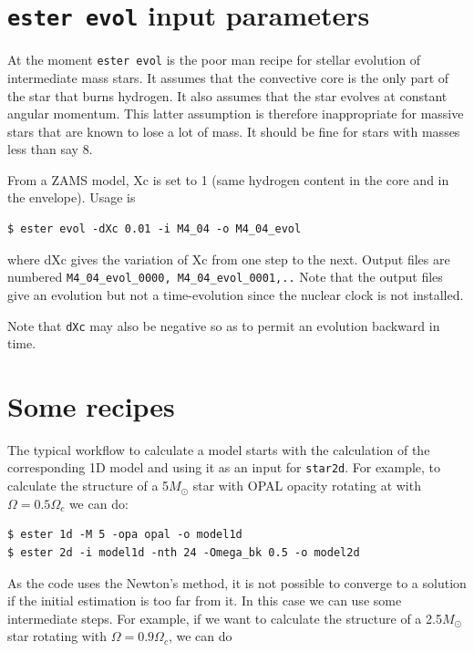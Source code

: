 \section{{\tt ester evol} input parameters}

At the moment {\tt ester evol} is the poor man recipe for stellar
evolution of intermediate mass stars. It assumes that the convective core
is the only part of the star that burns hydrogen. It also assumes that
the star evolves at constant angular momentum. This latter assumption
is therefore inappropriate for massive stars that are known to lose a
lot of mass. It should be fine for stars with masses less than say 8\msun.

From a ZAMS model, Xc is set to 1 (same hydrogen content in the core and in
the envelope). Usage is 

\begin{verbatim}
$ ester evol -dXc 0.01 -i M4_04 -o M4_04_evol
\end{verbatim}

\noindent where  dXc gives the variation of Xc from one step to the next. Output
files are numbered {\tt M4\_04\_evol\_0000, M4\_04\_evol\_0001,..} Note
that the output files give an evolution but not a time-evolution since
the nuclear clock is not installed.

Note that {\tt dXc} may also be negative so as to permit an evolution
backward in time.





\section{Some recipes}

The typical workflow to calculate a model starts with the calculation of
the corresponding 1D model and using it as an input for {\tt star2d}. For
example, to calculate the structure of a 5$M_\odot$ star with OPAL
opacity rotating at with $\Omega=0.5\Omega_c$ we can do:

\begin{verbatim}
$ ester 1d -M 5 -opa opal -o model1d
$ ester 2d -i model1d -nth 24 -Omega_bk 0.5 -o model2d
\end{verbatim}

As the code uses the Newton's method, it is not possible
to converge to a solution if the initial estimation is too far from
it. In this case we can use some intermediate steps.  For example, if
we want to calculate the structure of a 2.5$M_\odot$ star rotating with
$\Omega=0.9\Omega_c$, we can do

